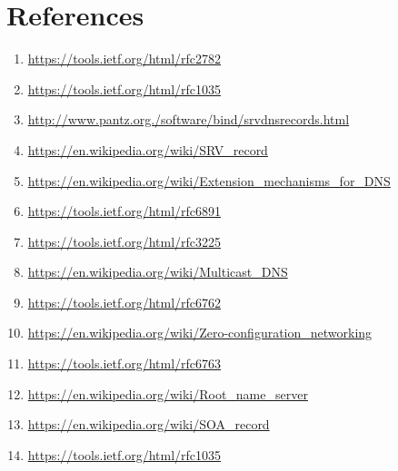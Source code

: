 \documentclass[a4paper]{article}
\begin{document}
\section*{References}
\begin{enumerate}
    \item \href{https://tools.ietf.org/html/rfc2782}{https://tools.ietf.org/html/rfc2782}
\item \href{https://tools.ietf.org/html/rfc1035}{https://tools.ietf.org/html/rfc1035}
\item \href{http://www.pantz.org./software/bind/srvdnsrecords.html}{http://www.pantz.org./software/bind/srvdnsrecords.html}
\item \href{https://en.wikipedia.org/wiki/SRV\_record}{https://en.wikipedia.org/wiki/SRV\_record}
\item \href{https://en.wikipedia.org/wiki/Extension\_mechanisms\_for\_DNS}{https://en.wikipedia.org/wiki/Extension\_mechanisms\_for\_DNS}
\item \href{https://tools.ietf.org/html/rfc6891}{https://tools.ietf.org/html/rfc6891}
\item \href{https://tools.ietf.org/html/rfc3225}{https://tools.ietf.org/html/rfc3225}
\item \href{https://en.wikipedia.org/wiki/Multicast\_DNS}{https://en.wikipedia.org/wiki/Multicast\_DNS}
\item \href{https://tools.ietf.org/html/rfc6762}{https://tools.ietf.org/html/rfc6762}
\item \href{https://en.wikipedia.org/wiki/Zero-configuration\_networking}{https://en.wikipedia.org/wiki/Zero-configuration\_networking}
\item \href{https://tools.ietf.org/html/rfc6763}{https://tools.ietf.org/html/rfc6763}
\item \href{https://en.wikipedia.org/wiki/Root\_name\_server}{https://en.wikipedia.org/wiki/Root\_name\_server}
\item \href{https://en.wikipedia.org/wiki/SOA\_record}{https://en.wikipedia.org/wiki/SOA\_record}
\item \href{https://tools.ietf.org/html/rfc1035}{https://tools.ietf.org/html/rfc1035}
\end{enumerate}
\end{document}
